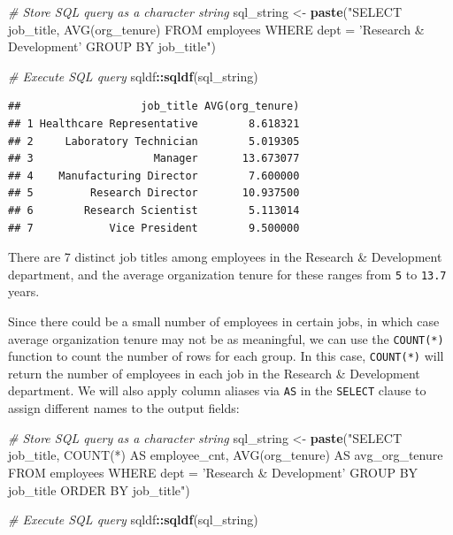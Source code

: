 \documentclass[]{book}
\newenvironment{Shaded}{\begin{snugshade}}{\end{snugshade}}
\newcommand{\CommentTok}[1]{\textcolor[rgb]{0.56,0.35,0.01}{\textit{#1}}}
\newcommand{\KeywordTok}[1]{\textcolor[rgb]{0.13,0.29,0.53}{\textbf{#1}}}
\newcommand{\NormalTok}[1]{#1}
\newcommand{\OperatorTok}[1]{\textcolor[rgb]{0.81,0.36,0.00}{\textbf{#1}}}
\newcommand{\StringTok}[1]{\textcolor[rgb]{0.31,0.60,0.02}{#1}}
\begin{document}
\begin{Shaded}
\begin{Highlighting}[]
\CommentTok{# Store SQL query as a character string}
\NormalTok{sql_string <-}\StringTok{ }\KeywordTok{paste}\NormalTok{(}\StringTok{"SELECT}
\StringTok{                      job_title,}
\StringTok{                      AVG(org_tenure)}
\StringTok{                    FROM}
\StringTok{                      employees}
\StringTok{                    WHERE}
\StringTok{                      dept = 'Research & Development'}
\StringTok{                    GROUP BY}
\StringTok{                      job_title"}\NormalTok{)}

\CommentTok{# Execute SQL query}
\NormalTok{sqldf}\OperatorTok{::}\KeywordTok{sqldf}\NormalTok{(sql_string)}
\end{Highlighting}
\end{Shaded}

\begin{verbatim}
##                   job_title AVG(org_tenure)
## 1 Healthcare Representative        8.618321
## 2     Laboratory Technician        5.019305
## 3                   Manager       13.673077
## 4    Manufacturing Director        7.600000
## 5         Research Director       10.937500
## 6        Research Scientist        5.113014
## 7            Vice President        9.500000
\end{verbatim}

There are 7 distinct job titles among employees in the Research \& Development department, and the average organization tenure for these ranges from \texttt{5} to \texttt{13.7} years.

Since there could be a small number of employees in certain jobs, in which case average organization tenure may not be as meaningful, we can use the \texttt{COUNT(*)} function to count the number of rows for each group. In this case, \texttt{COUNT(*)} will return the number of employees in each job in the Research \& Development department. We will also apply column aliases via \texttt{AS} in the \texttt{SELECT} clause to assign different names to the output fields:

\begin{Shaded}
\begin{Highlighting}[]
\CommentTok{# Store SQL query as a character string}
\NormalTok{sql_string <-}\StringTok{ }\KeywordTok{paste}\NormalTok{(}\StringTok{"SELECT}
\StringTok{                      job_title,}
\StringTok{                      COUNT(*) AS employee_cnt,}
\StringTok{                      AVG(org_tenure) AS avg_org_tenure}
\StringTok{                    FROM}
\StringTok{                      employees}
\StringTok{                    WHERE}
\StringTok{                      dept = 'Research & Development'}
\StringTok{                    GROUP BY}
\StringTok{                      job_title}
\StringTok{                    ORDER BY}
\StringTok{                      job_title"}\NormalTok{)}

\CommentTok{# Execute SQL query}
\NormalTok{sqldf}\OperatorTok{::}\KeywordTok{sqldf}\NormalTok{(sql_string)}
\end{Highlighting}
\end{Shaded}
\end{document}
